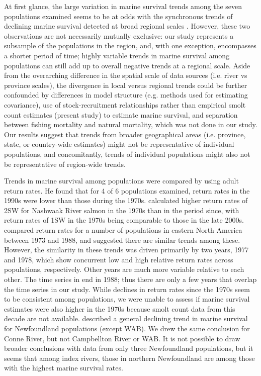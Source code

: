 \documentclass[12pt]{article}
\begin{document}
At first glance, the large variation in marine survival trends among the seven
populations examined seems to be at odds with the synchronous
trends of declining marine survival detected at broad regional scales
\citep{Olmos2019}. However, these two observations are not necessarily mutually
exclusive: our study represents a subsample of the populations in the region,
and, with one exception, encompasses a shorter period of time; highly variable
trends in marine survival among populations can still add
up to overall negative trends at a regional scale.
Aside from the overarching difference in the spatial scale of data sources
(i.e. river vs province scales), the divergence in local versus regional
trends could be further confounded by differences in model structure (e.g.
methods used for estimating covariance), use of stock-recruitment
relationships \citep{Olmos2019} rather than empirical smolt count estimates
(present study) to estimate marine survival, and separation between fishing mortality
and natural mortality, which was not done in our study.
Our results suggest that trends from broader geographical areas (i.e.
province, state, or country-wide estimates) might not be representative of
individual populations, and concomitantly, trends of individual populations
might also not be representative of region-wide trends.

Trends in marine survival
among populations were compared by \citet{Chaput2012a} using adult return rates.
He found that for 4 of 6 populations examined, return rates in the 1990s
were lower than those during the 1970s.
\citet{Gibson2016} calculated higher return rates of 2SW for Nashwaak River salmon in
the 1970s than in the period since, with return rates of 1SW in the 1970s
being comparable to those in the late 2000s.
\citet{Friedland1993} compared return rates for a number of populations in eastern
North America between 1973 and 1988, and suggested there are similar trends among these.
However, the similarity in these trends was driven primarily by two years, 1977 and 1978, which
show concurrent low and high relative return rates across populations,
respectively. Other years are much more variable relative to each other.
The time series in \citet{Friedland1993} end in
1988; thus there are only a few years that overlap the
time series in our study.
While declines in return rates since the 1970s seem to be consistent among
populations, we were unable to assess if marine survival estimates were also
higher in the 1970s because smolt count data from this decade are not available.
\citet{Dempson2003} described a general declining trend in marine survival for
Newfoundland populations (except WAB). We drew the same conclusion for Conne
River, but not Campbellton River or WAB. It is not possible to draw broader
conclusions with data from only three Newfoundland populations, but it seems
that among index rivers, those in northern Newfoundland are among those with
the highest marine survival rates.
\end{document}
